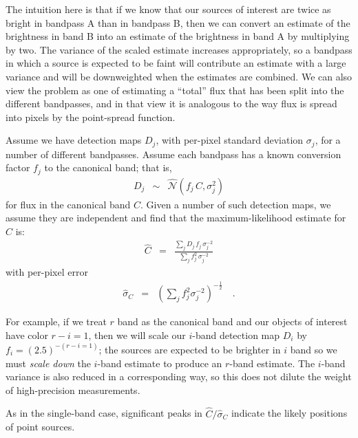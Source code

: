 \documentclass[letterpaper,preprint]{aastex}
\newcommand{\drawnfrom}{\sim}
\newcommand{\gaussianN}{\mathcal{N}}
\newcommand{\gaussx}[1]{\hat{\gaussianN}\!\left(#1\right)}
\begin{document}


The intuition here is that if we know that our sources of interest are
twice as bright in bandpass A than in bandpass B, then we can convert
an estimate of the brightness in band B into an estimate of the
brightness in band A by multiplying by two.  The variance of the
scaled estimate increases appropriately, so a bandpass in which a
source is expected to be faint will contribute an estimate with a
large variance and will be downweighted when the estimates are
combined.  We can also view the problem as one of estimating a
``total'' flux that has been split into the different bandpasses, and
in that view it is analogous to the way flux is spread into pixels by
the point-spread function.

\newcommand{\sigdj}{\sigma_{j}}

Assume we have detection maps $D_j$, with per-pixel standard deviation
$\sigdj$, for a number of different bandpasses.  Assume each
bandpass has a known conversion factor $f_j$ to the canonical band;
that is,
\begin{eqnarray}
  D_j & \drawnfrom & \gaussx{f_j \, C, \sigdj^2}
\end{eqnarray}
for flux in the canonical band $C$.  Given a number of such detection
maps, we assume they are independent and find that the
maximum-likelihood estimate for $C$ is:
\begin{eqnarray}
  \hat{C} &=& 
  \frac{\sum_j D_j \, f_j \, \sigdj^{-2}}%
       {\sum_j f_j^2 \, \sigdj^{-2}}
\end{eqnarray}
with per-pixel error
\begin{eqnarray}
  \hat{\sigma}_C &=& \left( \sum_j f_j^2 \sigdj^{-2} \right)^{-\frac{1}{2}}
  \quad .
\end{eqnarray}


For example, if we treat $r$ band as the canonical band and our
objects of interest have color $r-i = 1$, then we will scale our
$i$-band detection map $D_i$ by $f_i = (2.5)^{-(r-i = 1)}$; the
sources are expected to be brighter in $i$ band so we must \emph{scale
  down} the $i$-band estimate to produce an $r$-band estimate.  The
$i$-band variance is also reduced in a corresponding way, so this does
not dilute the weight of high-precision measurements.


As in the single-band case, significant peaks in $\hat{C} /
\hat{\sigma}_C$ indicate the likely positions of point sources.
\end{document}
